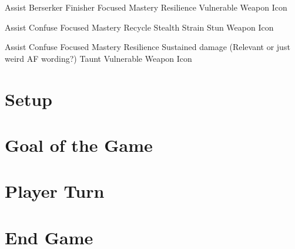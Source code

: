 \documentclass[12pt]{article}
\begin{document}
\pagebreak

\begin{mdframed}[style=SummaryCard, align=center, userdefinedwidth=35em, frametitle={Important Keywords (Dareon)}]
    Assist
    Berserker
    Finisher
    Focused Mastery
    Resilience
    Vulnerable
    Weapon Icon
\end{mdframed}

\pagebreak

\begin{mdframed}[style=SummaryCard, align=center, userdefinedwidth=35em, frametitle={Important Keywords (Thoreg)}]
    Assist
    Confuse
    Focused Mastery
    Recycle
    Stealth
    Strain
    Stun
    Weapon Icon
\end{mdframed}

\pagebreak

\begin{mdframed}[style=SummaryCard, align=center, userdefinedwidth=35em, frametitle={Important Keywords (Ljonar)}]
    Assist
    Confuse
    Focused Mastery
    Resilience
    Sustained damage (Relevant or just weird AF wording?)
    Taunt
    Vulnerable
    Weapon Icon
\end{mdframed}

\pagebreak

\begin{mdframed}[style = customFrame]
\begin{multicols*}{2}

\section*{Setup}
\section*{Goal of the Game}
\section*{Player Turn}
\section*{End Game}

\end{multicols*}
\end{mdframed}
\end{document}
